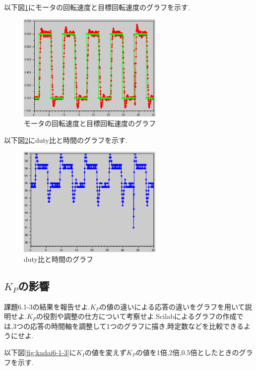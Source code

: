 \documentclass{jarticle}
\begin{document}
以下図\ref{fig:kadai6-1-1-1}にモータの回転速度と目標回転速度のグラフを示す.

\begin{figure}[H]
\begin{center}
\includegraphics[width=7.0cm]{images/kadai6-1-1-1.eps}
\caption{モータの回転速度と目標回転速度のグラフ}
\label{fig:kadai6-1-1-1}
\end{center}
\end{figure}

以下図\ref{fig:kadai6-1-1-2}にduty比と時間のグラフを示す.

\begin{figure}[H]
\begin{center}
\includegraphics[width=7.0cm]{images/kadai6-1-1-2.eps}
\caption{duty比と時間のグラフ}
\label{fig:kadai6-1-1-2}
\end{center}
\end{figure}

\subsection{$K_P$の影響}
課題6.1-3の結果を報告せよ.$K_P$の値の違いによる応答の違いをグラフを用いて説明せよ.$K_P$の役割や調整の仕方について考察せよ.Scilabによるグラフの作成では,3つの応答の時間軸を調整して1つのグラフに描き,時定数などを比較できるようにせよ.

以下図\ref{fig:kadai6-1-3}に$K_I$の値を変えず$K_P$の値を1倍,2倍,0.5倍としたときのグラフを示す.
\end{document}
